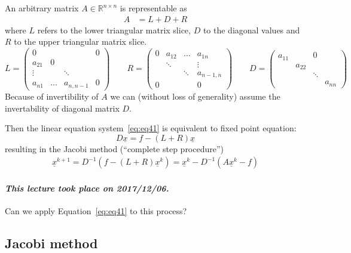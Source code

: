 \documentclass{article}
\newcommand{\dateref}[1]{\paragraph{\textit{This lecture took place on #1.}}}
\begin{document}
An arbitrary matrix $A \in \mathbb R^{n \times n}$ is representable as
\begin{align} A &= L + D + R \label{eq:eq47} \end{align}
where $L$ refers to the lower triangular matrix slice, $D$ to the diagonal values and $R$ to the upper triangular matrix slice.
\[
  L = \begin{pmatrix}
    0      &        &           & 0 \\
    a_{21} & 0      &           & \\
    \vdots &        & \ddots    & \\
    a_{n1} & \ldots & a_{n,n-1} & 0
  \end{pmatrix}
  \qquad
  R = \begin{pmatrix}
    0      & a_{12} & \ldots    & a_{1n} \\
           & \ddots &           & \vdots \\
           &        & \ddots    & a_{n-1,n} \\
    0      &        &           & 0
  \end{pmatrix}
  \qquad
  D = \begin{pmatrix}
    a_{11} &        & 0       & \\
           & a_{22} &         & \\
           &        & \ddots  & \\
           &        &         & a_{nn}
  \end{pmatrix}
\]
Because of invertibility of $A$ we can (without loss of generality) assume the invertability of diagonal matrix $D$.

Then the linear equation system~\ref{eq:eq41} is equivalent to fixed point equation:
\[ D \underline{x} = f - (L + R) \underline{x} \]
resulting in the Jacobi method (\enquote{complete step procedure})
\begin{align} \underline{x}^{k+1} = D^{-1}(f - (L + R) \underline{x}^k) = \underline{x}^k - D^{-1} (A\underline{x}^k - f) \label{eq:eq48} \end{align}

\dateref{2017/12/06}

Can we apply Equation~\ref{eq:eq41} to this process?

\subsection{Jacobi method}
\end{document}
